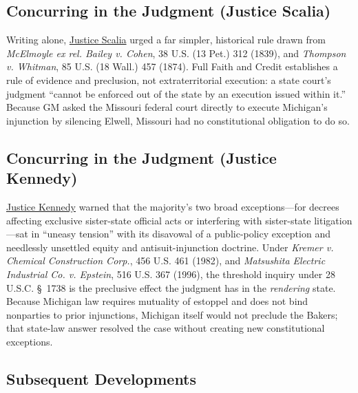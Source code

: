 \documentclass[12pt]{article}
\begin{document}
\subsection{Concurring in the Judgment (Justice Scalia)}

Writing alone, \href{https://www.law.cornell.edu/supct/html/96-653.ZC.html}{Justice Scalia} urged a far simpler, historical rule drawn from \textit{McElmoyle ex rel. Bailey v. Cohen}, 38 U.S. (13 Pet.) 312 (1839), and \textit{Thompson v. Whitman}, 85 U.S. (18 Wall.) 457 (1874). Full Faith and Credit establishes a rule of evidence and preclusion, not extraterritorial execution: a state court's judgment ``cannot be enforced out of the state by an execution issued within it.'' Because GM asked the Missouri federal court directly to execute Michigan's injunction by silencing Elwell, Missouri had no constitutional obligation to do so.

\subsection{Concurring in the Judgment (Justice Kennedy)}

\href{https://www.law.cornell.edu/supct/html/96-653.ZC1.html}{Justice Kennedy} warned that the majority's two broad exceptions---for decrees affecting exclusive sister-state official acts or interfering with sister-state litigation---sat in ``uneasy tension'' with its disavowal of a public-policy exception and needlessly unsettled equity and antisuit-injunction doctrine. Under \textit{Kremer v. Chemical Construction Corp.}, 456 U.S. 461 (1982), and \textit{Matsushita Electric Industrial Co. v. Epstein}, 516 U.S. 367 (1996), the threshold inquiry under 28 U.S.C. \S~1738 is the preclusive effect the judgment has in the \textit{rendering} state. Because Michigan law requires mutuality of estoppel and does not bind nonparties to prior injunctions, Michigan itself would not preclude the Bakers; that state-law answer resolved the case without creating new constitutional exceptions.

\subsection{Subsequent Developments}
\end{document}
